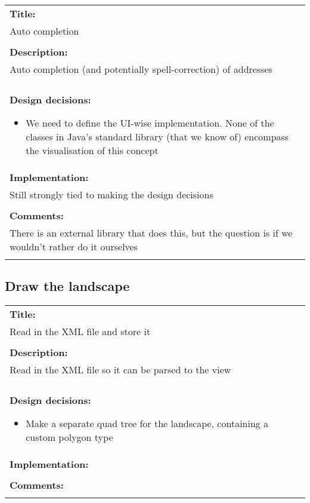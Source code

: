 \pagebreak
\begin{tabular}{ | p{12cm} | }
	\hline
	\textbf{Title:} \\
	Auto completion \\
	\\ \hline
	\textbf{Description:} \\
	Auto completion (and potentially spell-correction) of addresses \\
	\\ \hline
	\textbf{Design decisions:}
	\begin{itemize}
		\item We need to define the UI-wise implementation. None of the classes in Java's standard library (that we know of) encompass the visualisation of this concept
	\end{itemize}
	\\ \hline
	\textbf{Implementation:} \\
	Still strongly tied to making the design decisions \\
	\\ \hline
	\textbf{Comments:} \\
	There is an external library that does this, but the question is if we wouldn't rather do it ourselves \\
	\\ \hline
\end{tabular}

\pagebreak

\subsection*{Draw the landscape}
\begin{tabular}{ | p{12cm} | }
	\hline
	\textbf{Title:} \\
	Read in the XML file and store it \\
	\\ \hline
	\textbf{Description:} \\
	Read in the XML file so it can be parsed to the view \\
	\\ \hline
	\textbf{Design decisions:}
	\begin{itemize}
		\item Make a separate quad tree for the landscape, containing a custom polygon type
	\end{itemize}
	\\ \hline
	\textbf{Implementation:} \\
	\\ \hline
	\textbf{Comments:} \\
	\\ \hline
\end{tabular}

